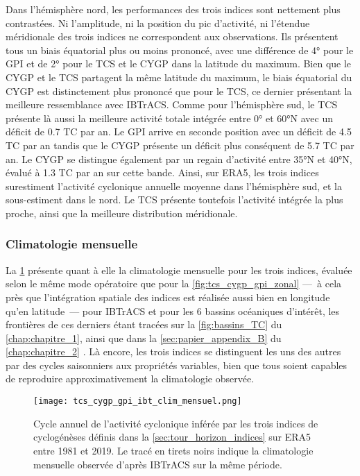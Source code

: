 \documentclass[../main.tex]{subfiles}
\begin{document}
Dans l'hémisphère nord, les performances des trois indices sont nettement plus contrastées. Ni l'amplitude, ni la position du pic d'activité, ni l'étendue
méridionale des trois indices ne correspondent aux observations. Ils présentent tous un biais équatorial plus ou moins prononcé, avec une différence de \ang{4}
pour le GPI et de \ang{2} pour le TCS et le CYGP dans la latitude du maximum. Bien que le CYGP et le TCS partagent la même latitude du maximum, le biais
équatorial du CYGP est distinctement plus prononcé que pour le TCS, ce dernier présentant la meilleure ressemblance avec IBTrACS. Comme pour l'hémisphère sud,
le TCS présente là aussi la meilleure activité totale intégrée entre \ang{0} et \ang{60}N avec un déficit de \num{0.7} TC par an. Le GPI arrive en seconde
position avec un déficit de \num{4.5} TC par an tandis que le CYGP présente un déficit plus conséquent de \num{5.7} TC par an. Le CYGP se distingue également
par un regain d'activité entre \ang{35}N et \ang{40}N, évalué à \num{1.3} TC par an sur cette bande. Ainsi, sur ERA5, les trois indices surestiment l'activité
cyclonique annuelle moyenne dans l'hémisphère sud, et la sous-estiment dans le nord. Le TCS présente toutefois l'activité intégrée la plus proche, ainsi que la
meilleure distribution méridionale.

\subsubsection*{Climatologie mensuelle}

La \cref{fig:tcs_cygp_gpi_clim_mensuel} présente quant à elle la climatologie mensuelle pour les trois indices, évaluée selon le même mode opératoire que pour
la \cref{fig:tcs_cygp_gpi_zonal} ---~à cela près que l'intégration spatiale des indices est réalisée aussi bien en longitude qu'en latitude~--- pour IBTrACS et
pour les 6 bassins océaniques d'intérêt, les frontières de ces derniers étant tracées sur la \cref{fig:bassins_TC} du \cref{chap:chapitre_1}, ainsi que dans la
\cref{sec:papier_appendix_B} du \cref{chap:chapitre_2} \parencite[][documents supplémentaires]{dulac_assessing_2023}. Là encore, les trois indices se
distinguent les uns des autres par des cycles saisonniers aux propriétés variables, bien que tous soient capables de reproduire approximativement la
climatologie observée. 

\begin{figure}[tb]
    \centering
    \texttt{[image: tcs\_cygp\_gpi\_ibt\_clim\_mensuel.png]}
    \caption{Cycle annuel de l'activité cyclonique inférée par les trois indices de cyclogénèses définis dans la \cref{sec:tour_horizon_indices} sur
    ERA5 entre 1981 et 2019. Le tracé en tirets noirs indique la climatologie mensuelle observée d'après IBTrACS sur la même période.}
    \label{fig:tcs_cygp_gpi_clim_mensuel}
\end{figure}
\end{document}
